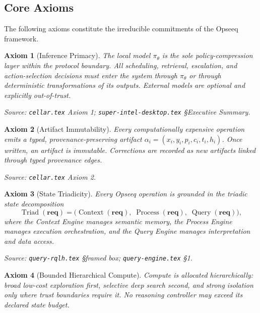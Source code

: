 \documentclass[11pt]{article}
\newtheorem{axiom}{Axiom}
\theoremstyle{remark}
\DeclareMathOperator{\Triad}{Triad}
\DeclareMathOperator{\Context}{Context}
\DeclareMathOperator{\Process}{Process}
\DeclareMathOperator{\Query}{Query}
\newcommand{\req}{\mathbf{req}}
\begin{document}
\subsection{Core Axioms}
\label{subsec:axioms}

The following axioms constitute the irreducible commitments of the Opseeq framework.

\begin{axiom}[Inference Primacy]
\label{ax:inference}
The local model $\pi_\theta$ is the sole policy-compression layer within the protocol boundary. All scheduling, retrieval, escalation, and action-selection decisions must enter the system through $\pi_\theta$ or through deterministic transformations of its outputs. External models are optional and explicitly out-of-trust.
\end{axiom}

\noindent\textit{Source: \texttt{cellar.tex} Axiom 1; \texttt{super-intel-desktop.tex} \S Executive Summary.}

\begin{axiom}[Artifact Immutability]
\label{ax:artifact}
Every computationally expensive operation emits a typed, provenance-preserving artifact $\alpha_i = (x_i, y_i, p_i, c_i, t_i, h_i)$. Once written, an artifact is immutable. Corrections are recorded as new artifacts linked through typed provenance edges.
\end{axiom}

\noindent\textit{Source: \texttt{cellar.tex} Axiom 2.}

\begin{axiom}[State Triadicity]
\label{ax:triad}
Every Opseeq operation is grounded in the triadic state decomposition
\[
\Triad(\req) = \bigl(\Context(\req),\; \Process(\req),\; \Query(\req)\bigr),
\]
where the Context Engine manages semantic memory, the Process Engine manages execution orchestration, and the Query Engine manages interpretation and data access.
\end{axiom}

\noindent\textit{Source: \texttt{query-rqlh.tex} \S framed box; \texttt{query-engine.tex} \S1.}

\begin{axiom}[Bounded Hierarchical Compute]
\label{ax:bounded}
Compute is allocated hierarchically: broad low-cost exploration first, selective deep search second, and strong isolation only where trust boundaries require it. No reasoning controller may exceed its declared state budget.
\end{axiom}
\end{document}

